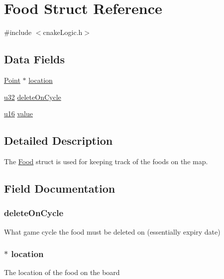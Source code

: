 \hypertarget{struct_food}{}\section{Food Struct Reference}
\label{struct_food}


{\ttfamily \#include $<$cnake\+Logic.\+h$>$}

\subsection*{Data Fields}
\begin{DoxyCompactItemize}
\item 
\hyperlink{struct_point}{Point} $\ast$ \hyperlink{struct_food_a89408ee02ab1ebdda1bb89dbfd56f7a1}{location}
\item 
\hyperlink{my_lib_8h_a10e94b422ef0c20dcdec20d31a1f5049}{u32} \hyperlink{struct_food_a6748ed675c840e1a6b6db19cc5b0a606}{delete\+On\+Cycle}
\item 
\hyperlink{my_lib_8h_a9e6c91d77e24643b888dbd1a1a590054}{u16} \hyperlink{struct_food_a66236e78407f7f7560eb9ece512621c7}{value}
\end{DoxyCompactItemize}


\subsection{Detailed Description}
The \hyperlink{struct_food}{Food} struct is used for keeping track of the foods on the map. 

\subsection{Field Documentation}
\subsubsection[{\texorpdfstring{delete\+On\+Cycle}{deleteOnCycle}}]{ delete\+On\+Cycle}\hypertarget{struct_food_a6748ed675c840e1a6b6db19cc5b0a606}{}\label{struct_food_a6748ed675c840e1a6b6db19cc5b0a606}
What game cycle the food must be deleted on (essentially expiry date) 
\subsubsection[{\texorpdfstring{location}{location}}]{$\ast$ location}\hypertarget{struct_food_a89408ee02ab1ebdda1bb89dbfd56f7a1}{}\label{struct_food_a89408ee02ab1ebdda1bb89dbfd56f7a1}
The location of the food on the board 

